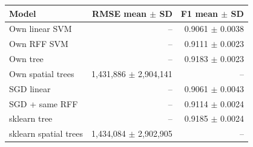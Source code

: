 \begin{tabular}{@{}lrr@{}}
\toprule
Model & RMSE mean $\pm$ SD & F1 mean $\pm$ SD \\
\midrule
Own linear SVM & -- & 0.9061 $\pm$ 0.0038 \\
Own RFF SVM & -- & 0.9111 $\pm$ 0.0023 \\
Own tree & -- & 0.9183 $\pm$ 0.0023 \\
Own spatial trees & 1,431,886 $\pm$ 2,904,141 & -- \\
SGD linear & -- & 0.9061 $\pm$ 0.0043 \\
SGD + same RFF & -- & 0.9114 $\pm$ 0.0024 \\
sklearn tree & -- & 0.9185 $\pm$ 0.0024 \\
sklearn spatial trees & 1,434,084 $\pm$ 2,902,905 & -- \\
\bottomrule
\end{tabular}
